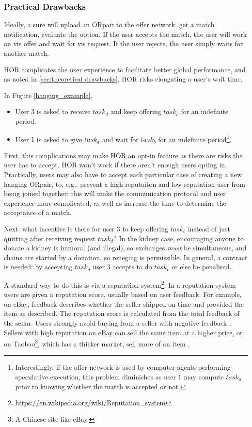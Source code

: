 \documentclass[main.tex]{subfiles}
\begin{document}
\subsubsection{Practical Drawbacks}
Ideally, a sure will upload an ORpair to the offer network, get a match notification, evaluate the option. If the user accepts the match, the user will work on vis offer and wait for vis request. If the user rejects, the user simply waits for another match.

HOR complicates the user experience to facilitate better global performance, and as noted in \ref{sec:theoretical drawbacks}, HOR risks elongating a user's wait time.

In Figure \ref{hanging_example},
\begin{itemize}
  \item User $3$ is asked to receive $task_d$ and keep offering $task_c$ for an indefinite period.
  \item User $1$ is asked to give $task_a$ and wait for $task_b$ for an indefinite period\footnote{Interestingly, if the offer network is used by computer agents performing speculative execution, this problem diminishes as user $1$ may compute $task_a$ prior to knowing whether the match is accepted or not.}.
\end{itemize}

First, this complications may make HOR an opt-in feature as there are risks the user has to accept. HOR won't work if there aren't enough users opting in. Practically, users may also have to accept each particular case of creating a new hanging ORpair, to, e.g., prevent a high reputaiton and low reputation user from being joined together: this will make the communication protocol and user experience more complicated, as well as increase the time to determine the acceptance of a match.

Next: what incentive is there for user $3$ to keep offering $task_c$ instead of just quitting after receiving request $task_d$? In the kidney case, encouraging anyone to donate a kidney is immoral (and illegal), so exchanges \textit{must} be simultaneous, and chains are started by a donation, so reneging is permissible. In general, a contract is needed: by accepting $task_d$ user $3$ accepts to do $task_c$ or else be penalised.

A standard way to do this is via a reputation system\footnote{\url{https://en.wikipedia.org/wiki/Reputation_system}}. In a reputation system users are given a reputation score, usually based on user feedback. For example, on eBay, feedback describes whether the seller shipped on time and provided the item as described. The reputation score is calculated from the total feedback of the sellar. Users strongly avoid buying from a seller with negative feedback \cite{ebay}. Sellers with high reputation on eBay can sell the same item at a higher price, or on Taobao\footnote{A Chinese site like eBay.}, which has a thicker market, sell more of an item \cite{Ye1}.
\end{document}
